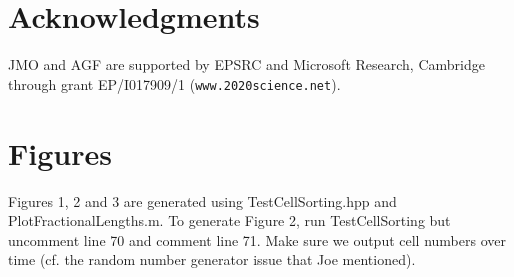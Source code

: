 \documentclass[12pt]{article}
\begin{document}

\section*{Acknowledgments}

JMO and AGF are supported by EPSRC and Microsoft Research, Cambridge through grant EP/I017909/1 ({\tt www.2020science.net}). 




%


\clearpage
\section{Figures}


Figures 1, 2 and 3 are generated using TestCellSorting.hpp and PlotFractionalLengths.m. To generate Figure 2, run TestCellSorting but uncomment line 70 and comment line 71. Make sure we output cell numbers over time (cf. the random number generator issue that Joe mentioned).
\end{document}
